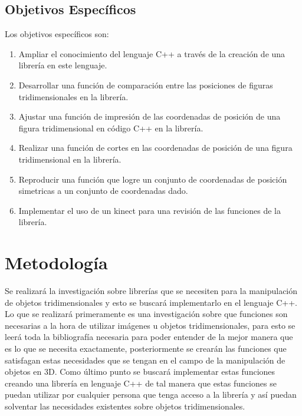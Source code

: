 \documentclass[letterpaper]{article}
\begin{document}
\subsection{Objetivos Específicos}

Los objetivos específicos son:\

\begin{enumerate}
\item Ampliar el conocimiento del lenguaje C++ a través de la creación de una librería en este lenguaje. 
\item Desarrollar una función de comparación entre las posiciones de figuras tridimensionales en la librería.
\item Ajustar una función de impresión de las coordenadas de posición de una figura tridimensional en código C++ en la librería. 
\item Realizar una función de cortes en las coordenadas de posición de una figura tridimensional en la librería.
\item Reproducir una función que logre un conjunto de coordenadas de posición simetricas a un conjunto de coordenadas dado.
\item Implementar el uso de un kinect para una revisión de las funciones de la librería.
\end{enumerate}

\section{Metodología}

Se realizará la investigación sobre librerías que se necesiten para la manipulación de objetos tridimensionales
 y esto se buscará implementarlo en el lenguaje C++. Lo que se realizará primeramente es una investigación sobre que funciones
  son necesarias a la hora de utilizar imágenes u objetos tridimensionales, para esto se leerá toda la bibliografía
   necesaria para poder entender de la mejor manera que es lo que se necesita exactamente, posteriormente se crearán
    las funciones que satisfagan estas necesidades que se tengan en el campo de la manipulación de objetos en 3D. Como
     último punto se buscará implementar estas funciones creando una librería en lenguaje C++ de tal manera que estas funciones
      se puedan utilizar por cualquier persona que tenga acceso a la librería y así puedan solventar las necesidades
       existentes sobre objetos tridimensionales.\\
\end{document}
